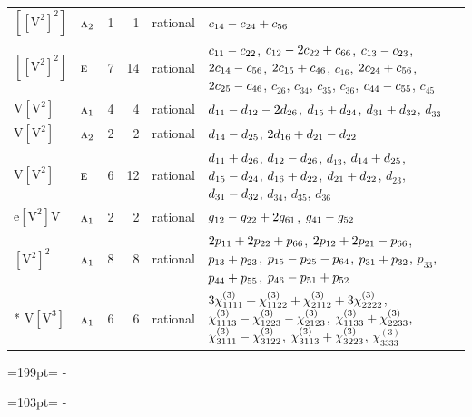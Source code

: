 \documentclass[10pt,a4paper]{article}
\newcommand{\needspace}[1]{\par\penalty-100\begingroup\dimen0=#1\relax\dimen2=\pagegoal
  \advance\dimen2-\pagetotal\ifdim\dimen0>\dimen2\relax\ifdim\dimen2>0pt\vfil\break\fi\fi
  \endgroup}
\numberwithin{equation}{section}
\newcommand{\irr}[1]{\text{\normalfont\scshape #1}}
\newcommand{\jahn}[1]{\mathrm{#1}}
\newlength{\fillwidth}\newlength{\cellwidth}\newlength{\colwidth}
\newcommand{\signbreak}{\penalty100\relax}
\begin{document}
{\begin{longtable}{@{}llrrl>{\RaggedRight\arraybackslash}p{\fillwidth}@{}}
$\jahn{[[V^{2}]^{2}]}$ & $\irr{a}_{2}$ & 1 & 1 & rational & $c_{14} -\signbreak c_{24} +\signbreak c_{56}$\\
$\jahn{[[V^{2}]^{2}]}$ & $\irr{e}$ & 7 & 14 & rational & $c_{11} -\signbreak c_{22}$, $c_{12} -\signbreak 2c_{22} +\signbreak c_{66}$, $c_{13} -\signbreak c_{23}$, $2c_{14} -\signbreak c_{56}$, $2c_{15} +\signbreak c_{46}$, $c_{16}$, $2c_{24} +\signbreak c_{56}$, $2c_{25} -\signbreak c_{46}$, $c_{26}$, $c_{34}$, $c_{35}$, $c_{36}$, $c_{44} -\signbreak c_{55}$, $c_{45}$\\
$\jahn{V[V^{2}]}$ & $\irr{a}_{1}$ & 4 & 4 & rational & $d_{11} -\signbreak d_{12} -\signbreak 2d_{26}$, $d_{15} +\signbreak d_{24}$, $d_{31} +\signbreak d_{32}$, $d_{33}$\\
$\jahn{V[V^{2}]}$ & $\irr{a}_{2}$ & 2 & 2 & rational & $d_{14} -\signbreak d_{25}$, $2d_{16} +\signbreak d_{21} -\signbreak d_{22}$\\
$\jahn{V[V^{2}]}$ & $\irr{e}$ & 6 & 12 & rational & $d_{11} +\signbreak d_{26}$, $d_{12} -\signbreak d_{26}$, $d_{13}$, $d_{14} +\signbreak d_{25}$, $d_{15} -\signbreak d_{24}$, $d_{16} +\signbreak d_{22}$, $d_{21} +\signbreak d_{22}$, $d_{23}$, $d_{31} -\signbreak d_{32}$, $d_{34}$, $d_{35}$, $d_{36}$\\
$\jahn{e[V^{2}]V}$ & $\irr{a}_{1}$ & 2 & 2 & rational & $\mathnormal{g}_{12} -\signbreak \mathnormal{g}_{22} +\signbreak 2\mathnormal{g}_{61}$, $\mathnormal{g}_{41} -\signbreak \mathnormal{g}_{52}$\\
$\jahn{[V^{2}]^{2}}$ & $\irr{a}_{1}$ & 8 & 8 & rational & $2p_{11} +\signbreak 2p_{22} +\signbreak p_{66}$, $2p_{12} +\signbreak 2p_{21} -\signbreak p_{66}$, $p_{13} +\signbreak p_{23}$, $p_{15} -\signbreak p_{25} -\signbreak p_{64}$, $p_{31} +\signbreak p_{32}$, $p_{33}$, $p_{44} +\signbreak p_{55}$, $p_{46} -\signbreak p_{51} +\signbreak p_{52}$\\*
$\jahn{V[V^{3}]}$ & $\irr{a}_{1}$ & 6 & 6 & rational & $3\chi^{(3)}_{1111} +\signbreak \chi^{(3)}_{1122} +\signbreak \chi^{(3)}_{2112} +\signbreak 3\chi^{(3)}_{2222}$, $\chi^{(3)}_{1113} -\signbreak \chi^{(3)}_{1223} -\signbreak \chi^{(3)}_{2123}$, $\chi^{(3)}_{1133} +\signbreak \chi^{(3)}_{2233}$, $\chi^{(3)}_{3111} -\signbreak \chi^{(3)}_{3122}$, $\chi^{(3)}_{3113} +\signbreak \chi^{(3)}_{3223}$, $\chi^{(3)}_{3333}$\\
\bottomrule\end{longtable}}
\needspace{199pt}
\needspace{103pt}
\end{document}
